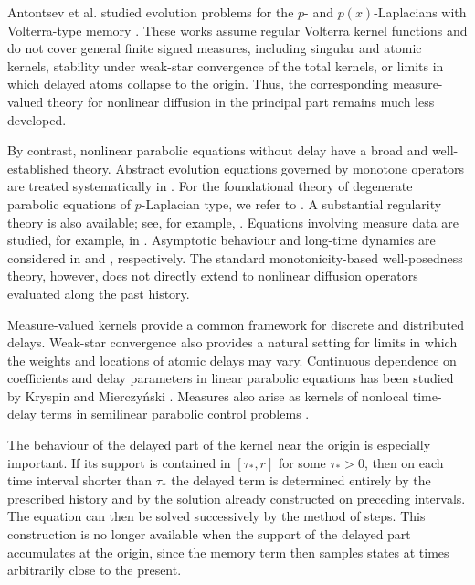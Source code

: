\documentclass[a4paper,11pt,oneside,reqno]{amsart}
\newcounter{c}
\newcounter{d}
\newcounter{b}
\begin{document}
Antontsev et al. studied evolution problems for the \(p\)- and
\(p(x)\)-Laplacians with Volterra-type memory
\cite{AntontsevShmarevSimsenSimsen2016EvolutionPLaplacianMemory,
AntontsevShmarevSimsenSimsen2019DifferentialInclusionPXMemory}.
These works assume regular Volterra kernel functions and do not cover
general finite signed measures, including singular and atomic kernels,
stability under weak-star convergence of the total kernels, or limits
in which delayed atoms collapse to the origin. Thus, the corresponding
measure-valued theory for nonlinear diffusion in the principal part
remains much less developed.

By contrast, nonlinear parabolic equations without delay have a broad and
well-established theory. Abstract evolution equations governed by monotone
operators are treated systematically in
\cite{Barbu2010NonlinearDifferentialEquationsMonotoneTypesBanachSpaces,
Showalter1997MonotoneOperatorsBanachSpaceNonlinearPDE}.
For the foundational theory of degenerate parabolic equations of
\(p\)-Laplacian type, we refer to
\cite{DiBenedetto1993DegenerateParabolicEquations}.
A substantial regularity theory is also available; see, for example,
\cite{Boegelein2014GlobalCalderonZygmundNonlinearParabolicSystems,
CianchiMazya2020SecondOrderRegularityParabolicPLaplaceProblems}.
Equations involving measure data are studied, for example, in
\cite{ByunParkShin2021GlobalRegularityDegenerateSingularParabolicMeasureData}.
Asymptotic behaviour and long-time dynamics are considered in
\cite{CruzUribeMoenShao2025DegenerateParabolicPLaplacianEquations} and
\cite{FolinoPlazaStrani2021LongTimeDynamicsPLaplacianBistable},
respectively. The standard monotonicity-based well-posedness theory,
however, does not directly extend to nonlinear diffusion operators evaluated
along the past history.

Measure-valued kernels provide a common framework for discrete and
distributed delays. Weak-star convergence also provides a natural setting
for limits in which the weights and locations of atomic delays may vary.
Continuous dependence on coefficients and delay parameters in linear
parabolic equations has been studied by Kryspin and Mierczy\'nski
\cite{KryspinMierczynski2023ParabolicDifferentialEquationsBoundedDelay,
KryspinMierczynski2024SystemsParabolicEquationsDelays}.
Measures also arise as kernels of nonlocal time-delay terms in semilinear
parabolic control problems
\cite{CasasMateosTroeltzsch2018MeasureControlNonlocalTimeDelay}.

The behaviour of the delayed part of the kernel near the origin is especially
important. If its support is contained in \([\tau_*,r]\) for some
\(\tau_*>0\), then on each time interval shorter than \(\tau_*\) the delayed
term is determined entirely by the prescribed history and by the solution
already constructed on preceding intervals. The equation can then be solved
successively by the method of steps. This construction is no longer
available when the support of the delayed part accumulates at the origin,
since the memory term then samples states at times arbitrarily close to the
present.
\end{document}

